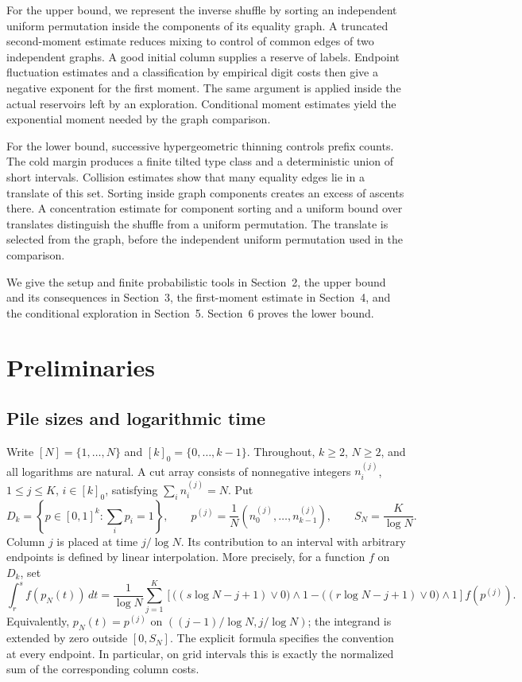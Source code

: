 \documentclass[11pt]{article}
\numberwithin{equation}{section}
\theoremstyle{definition}
\theoremstyle{remark}
\newcommand{\1}{\mathbf 1}
\begin{document}
For the upper bound, we represent the inverse shuffle by sorting an
independent uniform permutation inside the components of its equality
graph. A truncated second-moment estimate reduces mixing to control of
common edges of two independent graphs. A good initial column supplies a
reserve of labels. Endpoint fluctuation estimates and a classification by
empirical digit costs then give a negative exponent for the first moment.
The same argument is applied inside the actual reservoirs left by an
exploration. Conditional moment estimates yield the exponential moment
needed by the graph comparison.

For the lower bound, successive hypergeometric thinning controls prefix
counts. The cold margin produces a finite tilted type class and a
deterministic union of short intervals. Collision estimates show that many
equality edges lie in a translate of this set. Sorting inside graph
components creates an excess of ascents there. A concentration estimate for
component sorting and a uniform bound over translates distinguish the
shuffle from a uniform permutation. The translate is selected from the
graph, before the independent uniform permutation used in the comparison.

We give the setup and finite probabilistic tools in Section~2, the upper
bound and its consequences in Section~3, the first-moment estimate in
Section~4, and the conditional exploration in Section~5. Section~6 proves
the lower bound.


\section{Preliminaries}
\label{sec:preliminaries}

\subsection{Pile sizes and logarithmic time}

Write $[N]=\{1,\ldots,N\}$ and $[k]_0=\{0,\ldots,k-1\}$. Throughout,
$k\ge2$, $N\ge2$, and all logarithms are natural. A cut array consists of
nonnegative integers $n_i^{(j)}$, $1\le j\le K$, $i\in[k]_0$, satisfying
$\sum_i n_i^{(j)}=N$. Put
\[
 D_k=\left\{p\in[0,1]^k:\sum_i p_i=1\right\},\qquad
 p^{(j)}=\frac1N(n_0^{(j)},\ldots,n_{k-1}^{(j)}),\qquad
 S_N=\frac K{\log N}.
\]
Column $j$ is placed at time $j/\log N$. Its contribution to an interval
with arbitrary endpoints is defined by linear interpolation. More
precisely, for a function $f$ on $D_k$, set
\begin{equation}%
\label{eq:empirical-integral}
 \int_r^s f(p_N(t))\,dt
 =\frac1{\log N}\sum_{j=1}^K
 \left[\bigl((s\log N-j+1)\vee0\bigr)\wedge1
       -\bigl((r\log N-j+1)\vee0\bigr)\wedge1\right]f(p^{(j)}).
\end{equation}
Equivalently, $p_N(t)=p^{(j)}$ on
$((j-1)/\log N,j/\log N)$; the integrand is extended by zero outside
$[0,S_N]$. The explicit formula specifies the convention at every
endpoint. In particular, on grid intervals this is exactly the normalized
sum of the corresponding column costs.
\end{document}
